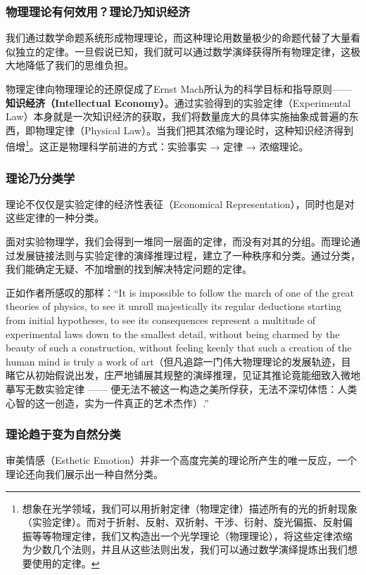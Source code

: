 \documentclass[12pt, a4paper, oneside]{ctexart}
\renewcommand{\b}{\textbf}
\newcommand{\f}{\footnote}
\begin{document}
\subsubsection{物理理论有何效用？理论乃知识经济}
我们通过数学命题系统形成物理理论，而这种理论用数量极少的命题代替了大量看似独立的定律。一旦假说已知，我们就可以通过数学演绎获得所有物理定律，这极大地降低了我们的思维负担。

物理定律向物理理论的还原促成了Ernst Mach所认为的科学目标和指导原则——\b{知识经济（Intellectual Economy）}。通过实验得到的实验定律（Experimental Law）本身就是一次知识经济的获取，我们将数量庞大的具体实施抽象成普遍的东西，即物理定律（Physical Law）。当我们把其浓缩为理论时，这种知识经济得到倍增\f{想象在光学领域，我们可以用折射定律（物理定律）描述所有的光的折射现象（实验定律）。而对于折射、反射、双折射、干涉、衍射、旋光偏振、反射偏振等等物理定律，我们又构造出一个光学理论（物理理论），将这些定律浓缩为少数几个法则，并且从这些法则出发，我们可以通过数学演绎提炼出我们想要使用的定律。}。这正是物理科学前进的方式：实验事实 → 定律 → 浓缩理论。

\subsubsection{理论乃分类学}
理论不仅仅是实验定律的经济性表征（Economical Representation），同时也是对这些定律的一种分类。

面对实验物理学，我们会得到一堆同一层面的定律，而没有对其的分组。而理论通过发展链接法则与实验定律的演绎推理过程，建立了一种秩序和分类。通过分类，我们能确定无疑、不加增删的找到解决特定问题的定律。

正如作者所感叹的那样：“It is impossible to follow the march of one of the great theories of physics, to see it unroll majestically its regular deductions starting from initial hypotheses, to see its consequences represent a multitude of experimental laws down to the smallest detail, without being charmed by the beauty of such a construction, without feeling keenly that such a creation of the human mind is truly a work of art（但凡追踪一门伟大物理理论的发展轨迹，目睹它从初始假说出发，庄严地铺展其规整的演绎推理，见证其推论竟能细致入微地摹写无数实验定律 —— 便无法不被这一构造之美所俘获，无法不深切体悟：人类心智的这一创造，实为一件真正的艺术杰作）.”

\subsubsection{理论趋于变为自然分类}
审美情感（Esthetic Emotion）并非一个高度完美的理论所产生的唯一反应，一个理论还向我们展示出一种自然分类。
\end{document}
